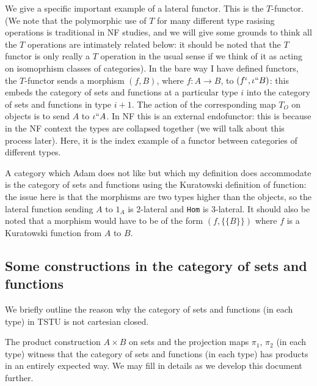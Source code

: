 \documentclass[12pt]{article}
\begin{document}
We give a specific important example of a lateral functor.  This is the $T$-functor.  (We note that the polymorphic use of $T$ for many different type rasising operations is traditional in NF studies, and we will give some grounds to think all the $T$ operations are intimately related below:  it should be noted that the $T$ functor is only really a $T$ operation in the usual sense if we think of it as acting on isomoprhism classes of categories).  In the bare way I have defined functors, the $T$-functor sends a morphism $(f,B)$, where $f:A \rightarrow B$, to $(f^{\iota},\iota``B)$:  this embeds the category of sets and functions at a particular type $i$ into the category of sets and functions in type $i+1$.  The action of the corresponding map $T_O$ on objects is to send $A$ to $\iota``A$.  In NF this is an external endofunctor:  this is because in the NF context the types are collapsed together (we will talk about this process later).  Here, it is the index example of a functor between categories of different types.

A category which Adam does not like but which my definition does accommodate is the category of sets and functions using the Kuratowski definition of function:  the issue here is that the morphisms are two types higher than the objects, so the lateral function sending $A$ to $1_A$ is 2-lateral and {\tt Hom} is 3-lateral.  It should also be noted that a morphism would have to be of the form $(f,\{\{B\}\})$ where $f$ is a Kuratowski function from $A$ to $B$.

\subsection{Some constructions in the category of sets and functions}

We briefly outline the reason why the category of sets and functions (in each type) in TSTU is not cartesian closed.

The product construction $A \times B$ on sets and the projection maps $\pi_1$, $\pi_2$ (in each type) witness that the category of sets and functions (in each type) has products in an entirely expected way.  We may fill in details as we develop this document further.
\end{document}
